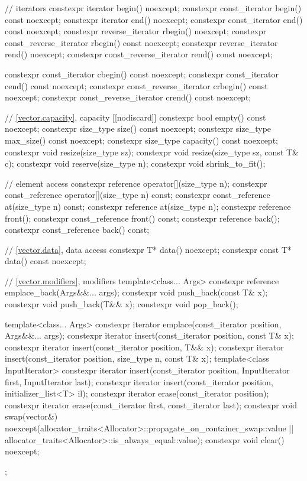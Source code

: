 \begin{codeblock}
{{    // iterators
    constexpr iterator               begin() noexcept;
    constexpr const_iterator         begin() const noexcept;
    constexpr iterator               end() noexcept;
    constexpr const_iterator         end() const noexcept;
    constexpr reverse_iterator       rbegin() noexcept;
    constexpr const_reverse_iterator rbegin() const noexcept;
    constexpr reverse_iterator       rend() noexcept;
    constexpr const_reverse_iterator rend() const noexcept;

    constexpr const_iterator         cbegin() const noexcept;
    constexpr const_iterator         cend() const noexcept;
    constexpr const_reverse_iterator crbegin() const noexcept;
    constexpr const_reverse_iterator crend() const noexcept;

    // \ref{vector.capacity}, capacity
    [[nodiscard]] constexpr bool empty() const noexcept;
    constexpr size_type size() const noexcept;
    constexpr size_type max_size() const noexcept;
    constexpr size_type capacity() const noexcept;
    constexpr void      resize(size_type sz);
    constexpr void      resize(size_type sz, const T& c);
    constexpr void      reserve(size_type n);
    constexpr void      shrink_to_fit();

    // element access
    constexpr reference       operator[](size_type n);
    constexpr const_reference operator[](size_type n) const;
    constexpr const_reference at(size_type n) const;
    constexpr reference       at(size_type n);
    constexpr reference       front();
    constexpr const_reference front() const;
    constexpr reference       back();
    constexpr const_reference back() const;

    // \ref{vector.data}, data access
    constexpr T*       data() noexcept;
    constexpr const T* data() const noexcept;

    // \ref{vector.modifiers}, modifiers
    template<class... Args> constexpr reference emplace_back(Args&&... args);
    constexpr void push_back(const T& x);
    constexpr void push_back(T&& x);
    constexpr void pop_back();

    template<class... Args> constexpr iterator emplace(const_iterator position, Args&&... args);
    constexpr iterator insert(const_iterator position, const T& x);
    constexpr iterator insert(const_iterator position, T&& x);
    constexpr iterator insert(const_iterator position, size_type n, const T& x);
    template<class InputIterator>
      constexpr iterator insert(const_iterator position,
                                InputIterator first, InputIterator last);
    constexpr iterator insert(const_iterator position, initializer_list<T> il);
    constexpr iterator erase(const_iterator position);
    constexpr iterator erase(const_iterator first, const_iterator last);
    constexpr void     swap(vector&)
      noexcept(allocator_traits<Allocator>::propagate_on_container_swap::value ||
               allocator_traits<Allocator>::is_always_equal::value);
    constexpr void     clear() noexcept;
  };

}
\end{codeblock}
